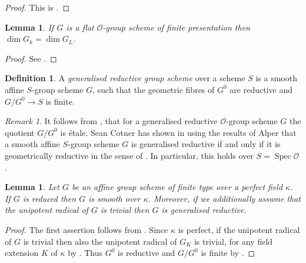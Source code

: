 \documentclass{amsart}
\newtheorem{lem}[prop]{Lemma}
\theoremstyle{definition}
\newtheorem{defi}[prop]{Definition}
\theoremstyle{remark}
\newtheorem{remar}[prop]{Remark}
\DeclareMathOperator{\Spec}{Spec}
\newcommand{\OO}{\mathcal O}
\begin{document}
\begin{proof}
    This is \cite[Expos\'e VIB, Proposition 9.2 (xi)]{SGA3_new}.
\end{proof}



\begin{lem}\label{dimLisdimk}
    If $G$ is a flat  $\OO$-group scheme of finite presentation
    then $\dim G_k = \dim G_L$.
\end{lem}

\begin{proof}
    See \cite[Expos\'e VIB, Corollaire 4.3]{SGA3_new}.
\end{proof}

\begin{defi}\label{defi_grg}
    A \emph{generalised reductive group scheme} over a scheme $S$ is a smooth affine $S$-group scheme $G$, such that the geometric fibres of $G^0$ are reductive and $G/G^0\rightarrow S$ is finite.
\end{defi}

\begin{remar}\label{rem_fin_etale}
    It follows from \cite[Proposition 3.1.3]{bcnrd}, that for a generalised reductive $\OO$-group scheme $G$ the quotient $G/G^0$ is \'etale. Sean Cotner has shown in \cite{cotner} using the results of Alper that a smooth affine $S$-group scheme $G$ is generalised reductive if and only if it is geometrically 
    reductive in the sense of \cite[Definition 9.1.1]{alper}. In particular, this holds over $S=\Spec \OO$. 
\end{remar}

\begin{lem}\label{gen_red_field} Let $G$ be an affine group scheme of finite type over a perfect field $\kappa$. If $G$ is reduced 
then $G$ is smooth over $\kappa$. Moreover, if we additionally assume that the 
unipotent radical of $G$ is trivial then $G$ is generalised reductive. 
\end{lem}

\begin{proof} The first assertion follows from \cite[\href{https://stacks.math.columbia.edu/tag/047N}{Tag 047N}, \href{https://stacks.math.columbia.edu/tag/047P}{Tag 047P}]{stacks-project}. Since $\kappa$ is perfect, if the unipotent radical of $G$ is trivial then also the unipotent radical of $G_{K}$ is trivial, for any field extension $K$ of $\kappa$ by \cite[Proposition 1.1.9]{CGP}. Thus $G^0$ is reductive and 
$G/G^0$ is finite by \cite[Proposition 3.1.3]{bcnrd}.
\end{proof}
\end{document}
